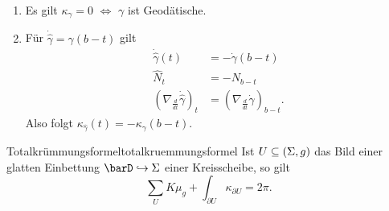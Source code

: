 \begin{bemerkungen}
\begin{enumerate}
\item Es gilt $\kappa_\gamma = 0$ $\iff$ $\gamma$ ist Geodätische.
\item Für $\dot{\hat{\gamma}} = \gamma(b-t)$ gilt
\begin{align}
\dot{\hat{\gamma}} (t) &= - \dot{\gamma} (b-t)\\
\hat{N}_t &= -N_{b-t}\\
\left( \nabla_\frac{d}{dt} \dot{\hat{\gamma}}\right)_t &= \left( \nabla_\frac{d}{dt} \dot{\gamma} \right)_{b-t}.
\end{align}
Also folgt $\kappa_{\hat{\gamma}}(t)=-\kappa_\gamma(b-t)$.
\end{enumerate}
\end{bemerkungen}
\begin{theorem}{Totalkrümmungsformel}{totalkruemmungsformel}
Ist $U\subseteq (\Sigma, g)$ das Bild einer glatten Einbettung $\barD \hookrightarrow \Sigma$ einer Kreisscheibe, so gilt
\begin{equation}
\sum_U K \mu_g + \int_{\partial U} \kappa_{\partial U} = 2 \pi.
\end{equation}
\end{theorem}

